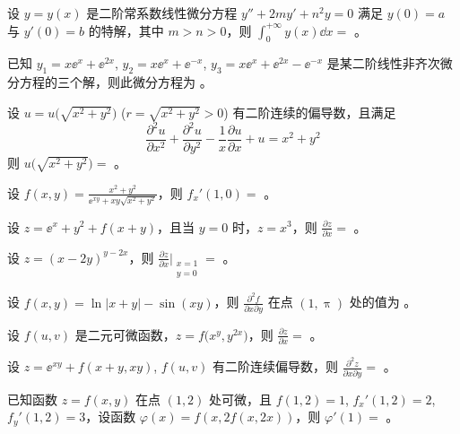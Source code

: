 \begin{ti}
	设 $y = y(x)$ 是二阶常系数线性微分方程 $y'' + 2my' + n^2y = 0$ 满足 $y(0) = a$ 与 $y'(0) = b$ 的特解，其中 $m > n > 0$，则 $\int_0^{+\infty} y(x) \dd{x} = $ \hua。
\end{ti}

\begin{ti}
	已知 $y_1 = x\ee^x + \ee^{2x}$, $y_2 = x\ee^x + \ee^{-x}$, $y_3 = x\ee^x + \ee^{2x} - \ee^{-x}$ 是某二阶线性非齐次微分方程的三个解，则此微分方程为 \hua。
\end{ti}

\begin{ti}
	设 $u = u \bigl( \sqrt{x^2 + y^2} \bigr)$ ($r = \sqrt{x^2 + y^2} > 0$) 有二阶连续的偏导数，且满足
	\[
		\frac{\partial^2u}{\partial x^2} + \frac{\partial^2u}{\partial y^2} - \frac 1x \frac{\partial u}{\partial x} + u = x^2 + y^2
	\]
	则 $u \bigl( \sqrt{x^2 + y^2} \bigr) = $ \hua。
\end{ti}

\begin{ti}
	设 $f(x,y) = \frac{x^2 + y^2}{\ee^{xy} + xy \sqrt{x^2 + y^2}}$，则 $f_x'(1,0) = $ \hua。
\end{ti}

\begin{ti}
	设 $z = \ee^x + y^2 + f(x+y)$，且当 $y=0$ 时，$z = x^3$，则 $\frac{\partial z}{\partial x} = $ \hua。
\end{ti}

\begin{ti}
	设 $z = (x-2y)^{y-2x}$，则 $\frac{\partial z}{\partial x}\biggl|_{\substack{x=1\\y=0}} = $ \hua。
\end{ti}

\begin{ti}
	设 $f(x,y) = \ln|x + y| - \sin(xy)$，则 $\frac{\partial^2f}{\partial x \partial y}$ 在点 $(1,\uppi)$ 处的值为 \hua。
\end{ti}

\begin{ti}
	设 $f(u,v)$ 是二元可微函数，$z = f\bigl( x^y,y^{2x} \bigr)$，则 $\frac{\partial z}{\partial x} = $ \hua。
\end{ti}

\begin{ti}
	设 $z = \ee^{xy} + f(x+y,xy)$, $f(u,v)$ 有二阶连续偏导数，则 $\frac{\partial^2z}{\partial x \partial y} = $ \hua。
\end{ti}

\begin{ti}
	已知函数 $z = f(x,y)$ 在点 $(1,2)$ 处可微，且 $f(1,2) = 1$, $f_x'(1,2) = 2$, $f_y'(1,2) = 3$，设函数 $\varphi(x) = f(x,2 f(x,2x))$，则 $\varphi'(1) = $ \hua。
\end{ti}

